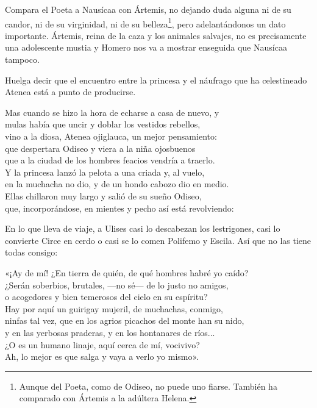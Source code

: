 Compara el Poeta a Nausícaa con Ártemis, no dejando duda alguna ni de su candor, ni de su virginidad, ni de su belleza\footnote{Aunque del Poeta, como de Odiseo, no puede uno fiarse. También ha comparado con Ártemis a la adúltera Helena.}, pero adelantándonos un dato importante. Ártemis, reina de la caza y los animales salvajes, no es precisamente una adolescente mustia y Homero nos va a mostrar enseguida que Nausícaa tampoco.

Huelga decir que el encuentro entre la princesa y el náufrago que ha celestineado Atenea está a punto de producirse.

\begin{versocita}
Mas cuando se hizo la hora de echarse a casa de nuevo, y\\
mulas había que uncir y doblar los vestidos rebellos,\\
vino a la diosa, Atenea ojiglauca, un mejor pensamiento:\\
que despertara Odiseo y viera a la niña ojosbuenos\\
que a la ciudad de los hombres feacios vendría a traerlo.\\
Y la princesa lanzó la pelota a una criada y, al vuelo,\\
en la muchacha no dio, y de un hondo cabozo dio en medio.\\
Ellas chillaron muy largo y salió de su sueño Odiseo,\\
que, incorporándose, en mientes y pecho así está revolviendo:
\end{versocita}

En lo que lleva de viaje, a Ulises casi lo descabezan los lestrigones, casi lo convierte Circe en cerdo o casi se lo comen Polifemo y Escila. Así que no las tiene todas consigo:

\begin{versocita}
«¡Ay de mí! ¿En tierra de quién, de qué hombres habré yo caído?\\
¿Serán soberbios, brutales, ---no sé--- de lo justo no amigos,\\
o acogedores y bien temerosos del cielo en su espíritu?\\
Hay por aquí un guirigay mujeril, de muchachas, conmigo,\\
ninfas tal vez, que en los agrios picachos del monte han su nido,\\
y en las yerbosas praderas, y en los hontanares de ríos...\\
¿O es un humano linaje, aquí cerca de mí, vocivivo?\\
Ah, lo mejor es que salga y vaya a verlo yo mismo».
\end{versocita}

